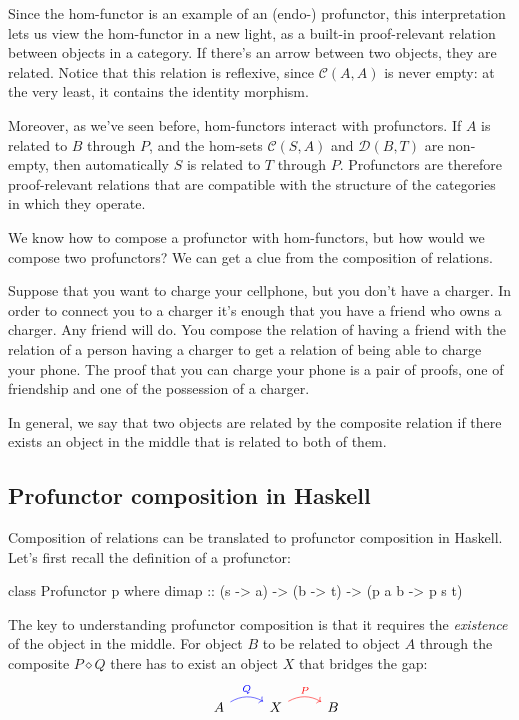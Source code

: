 \documentclass[DaoFP]{subfiles}
\begin{document}
Since the hom-functor is an example of an (endo-) profunctor, this interpretation lets us view the hom-functor in a new light, as a built-in proof-relevant relation between objects in a category. If there's an arrow between two objects, they are related. Notice that this relation is reflexive, since $\mathcal{C}(A, A)$ is never empty: at the very least, it contains the identity morphism. 

Moreover, as we've seen before, hom-functors interact with profunctors. If $A$ is related to $B$ through $P$, and the hom-sets $\mathcal{C}(S, A)$ and $\mathcal{D}(B, T)$ are non-empty, then automatically $S$ is related to $T$ through $P$. Profunctors are therefore proof-relevant relations that are compatible with the structure of the categories in which they operate.

We know how to compose a profunctor with hom-functors, but how would we compose two profunctors? We can get a clue from the composition of relations. 

Suppose that you want to charge your cellphone, but you don't have a charger. In order to connect you to a charger it's enough that you have a friend who owns a charger. Any friend will do. You compose the relation of having a friend with the relation of a person having a charger to get a relation of being able to charge your phone. The proof that you can charge your phone is a pair of proofs, one of friendship and one of the possession of a charger. 

In general, we say that two objects are related by the composite relation if there exists an object in the middle that is related to both of them. 

\subsection{Profunctor composition in Haskell}

Composition of relations can be translated to profunctor composition in Haskell. Let's first recall the definition of a profunctor:
\begin{haskell}
class Profunctor p where
  dimap :: (s -> a) -> (b -> t) -> (p a b -> p s t)
\end{haskell}

The key to understanding profunctor composition is that it requires the \emph{existence} of the object in the middle. For object $B$ to be related to object $A$ through the composite $P \diamond Q$ there has to exist an object $X$ that bridges the gap:
\[
 \begin{tikzcd}
  & A
  \arrow[r, bend left, blue, "Q"]
 & X
  \arrow[r, bend left, red, "P"]
 & B
  \end{tikzcd}
\]
\end{document}
